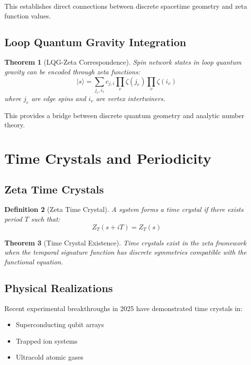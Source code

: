 \documentclass[12pt]{article}
\newtheorem{theorem}{Theorem}[section]
\newtheorem{definition}[theorem]{Definition}
\begin{document}
This establishes direct connections between discrete spacetime geometry and zeta function values.

\subsection{Loop Quantum Gravity Integration}

\begin{theorem}[LQG-Zeta Correspondence]
Spin network states in loop quantum gravity can be encoded through zeta functions:
$$|s\rangle = \sum_{j_e, i_v} c_{j,i} \prod_{e} \zeta(j_e) \prod_{v} \zeta(i_v)$$
where $j_e$ are edge spins and $i_v$ are vertex intertwiners.
\end{theorem}

This provides a bridge between discrete quantum geometry and analytic number theory.

\section{Time Crystals and Periodicity}

\subsection{Zeta Time Crystals}

\begin{definition}[Zeta Time Crystal]
A system forms a time crystal if there exists period $T$ such that:
$$Z_T(s + iT) = Z_T(s)$$
\end{definition}

\begin{theorem}[Time Crystal Existence]
Time crystals exist in the zeta framework when the temporal signature function has discrete symmetries compatible with the functional equation.
\end{theorem}

\subsection{Physical Realizations}

Recent experimental breakthroughs in 2025 have demonstrated time crystals in:
\begin{itemize}
\item Superconducting qubit arrays
\item Trapped ion systems
\item Ultracold atomic gases
\end{itemize}
\end{document}

